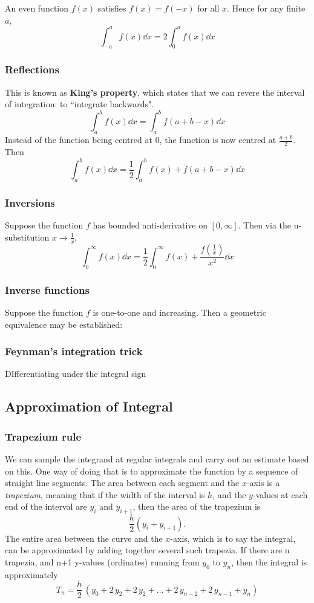 An even function $f(x)$ satisfies $f(x)=f(-x)$ for all $x$. Hence for any finite $a$,
\[ \int_{-a}^a f(x) \dd{x} = 2\int_0^a f(x) \dd{x} \]

\subsubsection{Reflections}
This is known as \textbf{King's property}, which states that we can revere the interval of integration: to ``integrate backwards".
\begin{equation}
\int_a^b f(x) \dd{x} = \int_a^b f(a+b-x) \dd{x}
\end{equation}
Instead of the function being centred at 0, the function is now centred at $\frac{a+b}{2}$. Then
\[ \int_a^b f(x) \dd{x} = \frac{1}{2} \int_a^b f(x) + f(a+b-x) \dd{x} \]

\subsubsection{Inversions}
Suppose the function $f$ has bounded anti-derivative on $[0,\infty]$. Then via the u-substitution $x\to\frac{1}{x}$,
\[ \int_0^\infty f(x) \dd{x} = \frac{1}{2}\int_0^\infty f(x) + \frac{f(\frac{1}{x})}{x^2} \dd{x} \]

\subsubsection{Inverse functions}
Suppose the function $f$ is one-to-one and increasing. Then a geometric equivalence may be established:


\subsubsection{Feynman's integration trick}
DIfferentiating under the integral sign

\subsection{Approximation of Integral}
\subsubsection{Trapezium rule}
We can sample the integrand at regular integrals and carry out an estimate based on this. One way of doing that is to approximate the function by a sequence of straight line segments. The area between each segment and the $x$-axis is a \emph{trapezium}, meaning that if the width of the interval is $h$, and the $y$-values at each end of the interval are $y_i$ and $y_{i+1}$, then the area of the trapezium is
\[ \frac{h}{2}(y_i+y_{i+1}). \]
The entire area between the curve and the $x$-axis, which is to say the integral, can be approximated by adding together several such trapezia. If there are n trapezia, and n+1 y-values (ordinates) running from $y_0$ to $y_n$, then the integral is approximately
\begin{equation}
T_n=\frac{h}{2}\,(y_0+2\,y_2+2\,y_2+\dots+2\,y_{n-2}+2\,y_{n-1}+y_n)
\end{equation}

